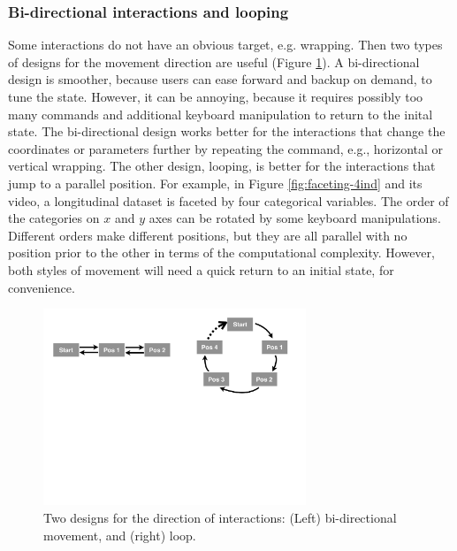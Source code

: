 \documentclass[12pt]{article}
\begin{document}
\subsubsection{Bi-directional interactions and looping}

Some interactions do not have an obvious target, e.g. wrapping.
Then two types of designs for the movement direction are useful
(Figure \ref{fig:interaction-direction}). A bi-directional design
is smoother, because users can ease forward and backup on demand,
to tune the state. However, it can be annoying, because it
requires possibly too many commands and additional keyboard
manipulation to return to the inital state. The bi-directional
design works better for the interactions that change the
coordinates or parameters further by repeating the command,
e.g., horizontal or vertical wrapping. The other design, looping,
is better for the interactions that jump to a parallel
position. For example, in Figure \ref{fig:faceting-4ind} and
its video, a longitudinal dataset is faceted by four categorical
variables. The order of the categories on $x$ and $y$ axes can
be rotated by some keyboard manipulations. Different orders make
different positions, but they are all parallel with no position
prior to the other in terms of the computational complexity.
However, both styles of movement will need a quick return to
an initial state, for convenience.


\begin{center}
\begin{figure}[H]
\begin{centering}
\includegraphics[width=0.70\textwidth]{graph/direction.pdf}
\par\end{centering}

\caption{\label{fig:interaction-direction}Two designs for the direction of
interactions: (Left) bi-directional movement, and (right) loop.}
\end{figure}

\par\end{center}
\end{document}
